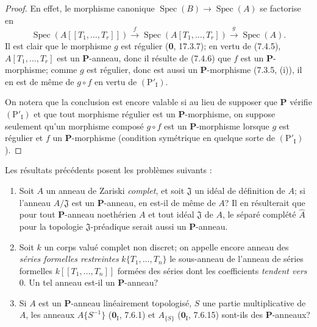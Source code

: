 \begin{proof}
En effet, le morphisme canonique
$\operatorname{Spec}(B)\to\operatorname{Spec}(A)$ se factorise en
\[
\operatorname{Spec}(A[[T_1,\ldots,T_r]])
\xrightarrow{f}\operatorname{Spec}(A[T_1,\ldots,T_r])
\xrightarrow{g}\operatorname{Spec}(A).
\]
Il est clair que le morphisme $g$ est régulier (\textbf{0}, 17.3.7); en vertu de
(7.4.5), $A[T_1,\ldots,T_r]$ est un $\boldsymbol P$-anneau, donc il résulte
de (7.4.6) que $f$ est un $\boldsymbol P$-morphisme; comme $g$ est régulier,
donc est aussi un $\boldsymbol P$-morphisme (7.3.5, (i)), il en est de même
de $g\circ f$ en vertu de $(\mathrm P'_{\mathrm I})$.

On notera que la conclusion est encore valable si au lieu de supposer que
$\boldsymbol P$ vérifie $(\mathrm P'_{\mathrm I})$ et que tout morphisme
régulier est un $\boldsymbol P$-morphisme, on suppose seulement qu'un
morphisme composé $g\circ f$ est un $\boldsymbol P$-morphisme lorsque $g$
est régulier et $f$ un $\boldsymbol P$-morphisme (condition symétrique en
quelque sorte de $(\mathrm P'_{\mathrm I})$).
\end{proof}

\begin{remark}[7.4.8]
\label{IV.2.s7.4.8-fr}
Les résultats précédents posent les problèmes suivants :
\begin{enumerate}
\item[A)] Soit $A$ un anneau de Zariski \emph{complet}, et soit
$\mathfrak J$ un idéal de définition de $A$; si l'anneau $A/\mathfrak J$
est un $\boldsymbol P$-anneau, en est-il de même de $A$? Il en résulterait
que pour tout $\boldsymbol P$-anneau noethérien $A$ et tout idéal
$\mathfrak J$ de $A$, le séparé complété $\widehat A$ pour la topologie
$\mathfrak J$-préadique serait aussi un $\boldsymbol P$-anneau.
\item[B)] Soit $k$ un corps valué complet non discret; on appelle
encore anneau des \emph{séries formelles restreintes}
$k\{T_1,\ldots,T_n\}$ le sous-anneau de l'anneau de séries formelles
$k[[T_1,\ldots,T_n]]$ formées des séries dont les coefficients \emph{tendent
vers} 0. Un tel anneau est-il un $\boldsymbol P$-anneau?
\item[C)] Si $A$ est un $\boldsymbol P$-anneau linéairement
topologisé, $S$ une partie multiplicative de $A$, les anneaux
$A\{S^{-1}\}$ ($\mathbf{0}_{\mathrm I}$, 7.6.1) et $A_{\{S\}}$
($\mathbf{0}_{\mathrm I}$, 7.6.15) sont-ils des $\boldsymbol P$-anneaux?
\end{enumerate}
\end{remark}

